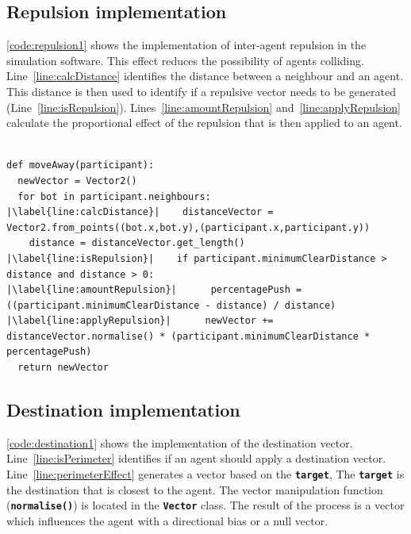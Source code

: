 \subsection{Repulsion implementation}
\autoref{code:repulsion1} shows the implementation of inter-agent repulsion in the simulation software. This effect reduces the possibility of agents colliding. Line~\autoref{line:calcDistance} identifies the distance between a neighbour and an agent. This distance is then used to identify if a repulsive vector needs to be generated (Line~\autoref{line:isRepulsion}). Lines~\autoref{line:amountRepulsion} and~\autoref{line:applyRepulsion} calculate the proportional effect of the repulsion that is then applied to an agent.

\lstset{language=Python,
basicstyle=\tiny,
numbers=left, 
numberstyle=\tiny,
captionpos=b,
frame=single,
breaklines=true,
caption=Repulsion code,
escapechar=|
} %
\begin{lstlisting}[label={code:repulsion1}]  % Start your code-block

def moveAway(participant):
  newVector = Vector2()
  for bot in participant.neighbours:
|\label{line:calcDistance}|    distanceVector = Vector2.from_points((bot.x,bot.y),(participant.x,participant.y))
    distance = distanceVector.get_length()
|\label{line:isRepulsion}|    if participant.minimumClearDistance > distance and distance > 0:
|\label{line:amountRepulsion}|      percentagePush = ((participant.minimumClearDistance - distance) / distance)
|\label{line:applyRepulsion}|      newVector += distanceVector.normalise() * (participant.minimumClearDistance * percentagePush)
  return newVector
\end{lstlisting}

\subsection{Destination implementation}
\autoref{code:destination1} shows the implementation of the destination vector. Line~\autoref{line:isPerimeter} identifies if an agent should apply a destination vector. Line~\autoref{line:perimeterEffect} generates a vector based on the \texttt{\textbf{target}}, The \texttt{\textbf{target}} is the destination that is closest to the agent. The vector manipulation function (\texttt{\textbf{normalise()}}) is located in the \texttt{\textbf{Vector}} class. The result of the process is a vector which influences the agent with a directional bias or a null vector.

